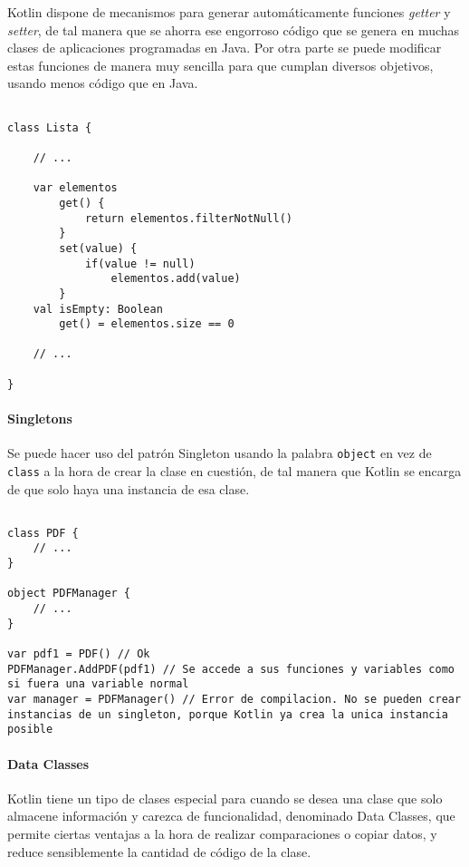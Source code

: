 Kotlin dispone de mecanismos para generar automáticamente funciones \textit{getter} y \textit{setter}, de tal manera que se ahorra ese engorroso código que se genera en muchas clases de aplicaciones programadas en Java. Por otra parte se puede modificar estas funciones de manera muy sencilla para que cumplan diversos objetivos, usando menos código que en Java.

\begin{verbatim}

class Lista {

	// ...
	
	var elementos
		get() {
			return elementos.filterNotNull()
		}
		set(value) {
			if(value != null)
				elementos.add(value)
		}
	val isEmpty: Boolean
		get() = elementos.size == 0
	
	// ...

}
\end{verbatim}

\paragraph{Singletons}
Se puede hacer uso del patrón Singleton usando la palabra \texttt{object} en vez de \texttt{class} a la hora de crear la clase en cuestión, de tal manera que Kotlin se encarga de que solo haya una instancia de esa clase.

\begin{verbatim}

class PDF {
	// ...
}

object PDFManager {
	// ...
}

var pdf1 = PDF() // Ok
PDFManager.AddPDF(pdf1) // Se accede a sus funciones y variables como si fuera una variable normal
var manager = PDFManager() // Error de compilacion. No se pueden crear instancias de un singleton, porque Kotlin ya crea la unica instancia posible

\end{verbatim}

\paragraph{Data Classes}

Kotlin tiene un tipo de clases especial para cuando se desea una clase que solo almacene información y carezca de funcionalidad, denominado Data Classes, que permite ciertas ventajas a la hora de realizar comparaciones o copiar datos, y reduce sensiblemente la cantidad de código de la clase.

